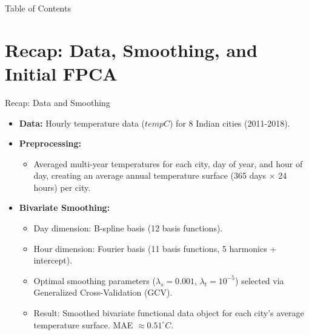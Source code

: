 \documentclass[svgnames, 12pt]{beamer}
\begin{document}
\begin{frame}{Table of Contents}
\tableofcontents
\end{frame}

\section{Recap: Data, Smoothing, and Initial FPCA}

\begin{frame}{Recap: Data and Smoothing}
  \begin{itemize}
    \item \textbf{Data:} Hourly temperature data ($tempC$) for 8 Indian cities (2011-2018).
    \item \textbf{Preprocessing:}
        \begin{itemize}
            \item Averaged multi-year temperatures for each city, day of year, and hour of day, creating an average annual temperature surface (365 days $\times$ 24 hours) per city.
        \end{itemize}
    \item \textbf{Bivariate Smoothing:}
        \begin{itemize}
            \item Day dimension: B-spline basis (12 basis functions).
            \item Hour dimension: Fourier basis (11 basis functions, 5 harmonics + intercept).
            \item Optimal smoothing parameters ($\lambda_s = 0.001$, $\lambda_t = 10^{-5}$) selected via Generalized Cross-Validation (GCV).
            \item Result: Smoothed bivariate functional data object for each city's average temperature surface. MAE $\approx 0.51^\circ C$.
        \end{itemize}
  \end{itemize}
\end{frame}
\end{document}
